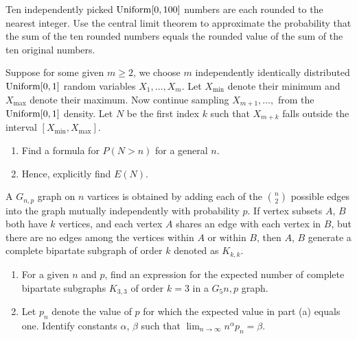 \begin{problem}
  Ten independently picked \(\operatorname{Uniform}[0,100]\) numbers are each rounded to
  the nearest integer. Use the central limit theorem to approximate the
  probability that the sum of the ten rounded numbers equals the rounded
  value of the sum of the ten original numbers.
\end{problem}
\begin{solution*}
\end{solution*}

\begin{problem}
  Suppose for some given \(m\geq 2\), we choose \(m\) independently
  identically distributed \(\operatorname{Uniform}[0,1]\) random variables
  \(X_1,\dotsc,X_m\). Let \(X_{\text{min}}\) denote their minimum and
  \(X_{\text{max}}\) denote their maximum. Now continue sampling
  \(X_{m+1},\dotsc,\) from the \(\operatorname{Uniform}[0,1]\) density. Let \(N\) be the
  first index \(k\) such that \(X_{m+k}\) falls outside the interval
  \([X_{\text{min}},X_{\text{max}}]\).
  \begin{enumerate}[label=(\alph*),noitemsep]
  \item Find a formula for \(P(N>n)\) for a general \(n\).
  \item Hence, explicitly find \(E(N)\).
  \end{enumerate}
\end{problem}
\begin{solution*}
\end{solution*}

\begin{problem}
  A \(G_{n,p}\) graph on \(n\) vartices is obtained by adding each of the
  \(\binom{n}{2}\) possible edges into the graph mutually independently
  with probability \(p\). If vertex subsets \(A\), \(B\) both have \(k\)
  vertices, and each vertex \(A\) shares an edge with each vertex in \(B\),
  but there are no edges among the vertices within \(A\) or within \(B\),
  then \(A\), \(B\) generate a complete bipartate subgraph of order \(k\)
  denoted as \(K_{k,k}\).
  \begin{enumerate}[label=(\alph*),noitemsep]
  \item For a given \(n\) and \(p\), find an expression for the
    expected number of complete bipartate subgraphs \(K_{3,3}\) of order
    \(k=3\) in a \(G_5n,p\) graph.
  \item Let \(p_n\) denote the value of \(p\) for which the expected
    value in part (a) equals one. Identify constants \(\alpha\), \(\beta\)
    such that \(\lim_{n\to\infty}n^\alpha p_n=\beta\).
  \end{enumerate}
\end{problem}
\begin{solution*}
\end{solution*}

